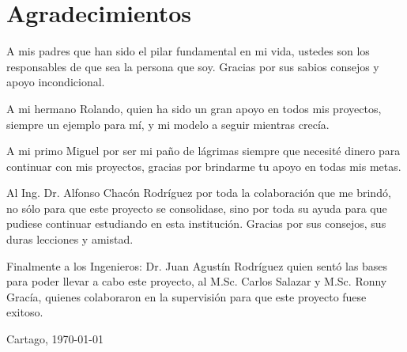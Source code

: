 \chapter*{Agradecimientos}
\thispagestyle{empty}

A mis padres que han sido el pilar fundamental en mi vida, ustedes son los responsables de que sea la persona que soy. Gracias por sus sabios consejos y apoyo incondicional.

A mi hermano Rolando, quien ha sido un gran apoyo en todos mis proyectos, siempre un ejemplo para mí, y mi modelo a seguir mientras crecía.

A mi primo Miguel por ser mi paño de lágrimas siempre que necesité dinero para continuar con mis proyectos, gracias por brindarme tu apoyo en todas mis metas.

Al Ing. Dr. Alfonso Chacón Rodríguez por toda la colaboración que me brindó, no sólo para que este proyecto se consolidase, sino por toda su ayuda para que pudiese continuar estudiando en esta institución. Gracias por sus consejos, sus duras lecciones y amistad.

Finalmente a los Ingenieros: Dr.  Juan Agustín Rodríguez quien sentó las bases para poder llevar a cabo este proyecto, al M.Sc. Carlos Salazar y M.Sc. Ronny Gracía, quienes colaboraron en la supervisión para que este proyecto fuese exitoso.







\vspace*{1cm}

\scriptAuthor

Cartago, \today

\cleardoublepage

